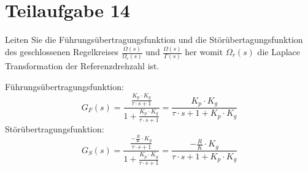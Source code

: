 \section{Teilaufgabe 14}
\begin{aufgabe}
    Leiten Sie die Führungsübertragungsfunktion und die 
    Störübertagungsfunktion des geschlossenen Regelkreises 
    $\frac{\Omega(s)}{\Omega_r(s)}$ und $\frac{\Omega(s)}{\Gamma(s)}$ her 
    womit $\Omega_r(s)$ die Laplace Transformation der Referenzdrehzahl ist.
\end{aufgabe}
Führungsübertragungsfunktion: 
\[ G_F(s) 
    = \frac{\frac{K_p \cdot K_g}{\tau \cdot s + 1}}
        {1 + \frac{K_p \cdot K_g}{\tau \cdot s + 1}}
    = \frac{K_p \cdot K_g}{\tau \cdot s + 1 + K_p \cdot K_g}
\]
Störübertragungsfunktion:
\[ G_S(s)
    = \frac{\frac{-\frac{R}{K} \cdot K_g}{\tau \cdot s + 1}}
        {1 + \frac{K_p \cdot K_g}{\tau \cdot s + 1}}
    = \frac{-\frac{R}{K} \cdot K_g}{\tau \cdot s + 1 + K_p \cdot K_g}
\]
